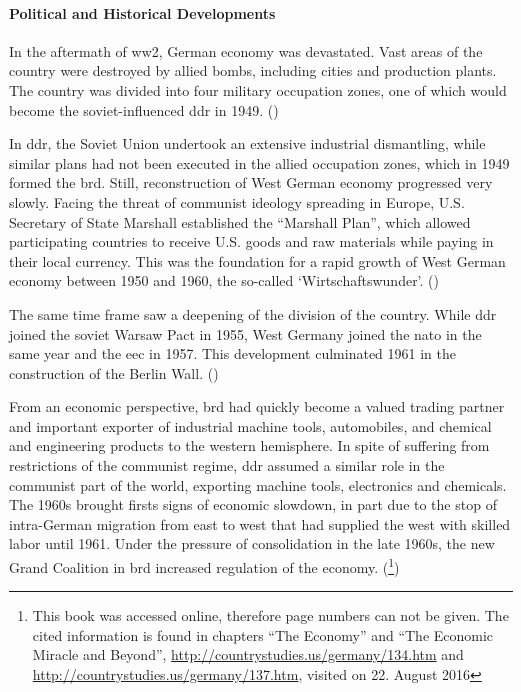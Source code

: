 \paragraph{Political and Historical Developments}
In the aftermath of \gls{ww2}, German economy was devastated. Vast areas of the country were destroyed by allied bombs, including cities and production plants. The country was divided into four military occupation zones, one of which would become the soviet-influenced \gls{ddr} in 1949. (\cite{BBC.2012})

In \gls{ddr}, the Soviet Union undertook an extensive industrial dismantling, while similar plans had not been executed in the allied occupation zones, which in 1949 formed the \gls{brd}. Still, reconstruction of West German economy progressed very slowly. Facing the threat of communist ideology spreading in Europe, U.S. Secretary of State Marshall established the ``Marshall Plan'', which allowed participating countries to receive U.S. goods and raw materials while paying in their local currency. This was the foundation for a rapid growth of West German economy between 1950 and 1960, the so-called `Wirtschaftswunder'. (\cite{Kimmel.2005})

The same time frame saw a deepening of the division of the country. While \gls{ddr} joined the soviet Warsaw Pact in 1955, West Germany joined the \gls{nato} in the same year and the \gls{eec} in 1957. This development culminated 1961 in the construction of the Berlin Wall. (\cite{BBC.2012})

From an economic perspective, \gls{brd} had quickly become a valued trading partner and important exporter of industrial machine tools, automobiles, and chemical and engineering products to the western hemisphere. In spite of suffering from restrictions of the communist regime, \gls{ddr} assumed a similar role in the communist part of the world, exporting machine tools, electronics and chemicals. The 1960s brought firsts signs of economic slowdown, in part due to the stop of intra-German migration from east to west that had supplied the west with skilled labor until 1961. Under the pressure of consolidation in the late 1960s, the new Grand Coalition in \gls{brd} increased regulation of the economy.
(\cite{Solsten.1995}\footnote{This book was accessed online, therefore page numbers can not be given. The cited information  is found in chapters ``The Economy'' and ``The Economic Miracle and Beyond'', \url{http://countrystudies.us/germany/134.htm} and \url{http://countrystudies.us/germany/137.htm}, visited on 22. August 2016})

